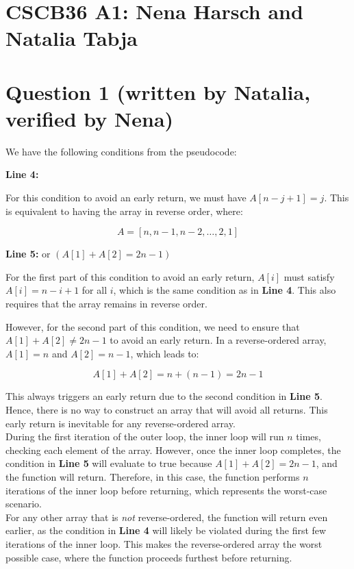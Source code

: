\documentclass[11pt, a4paper]{article}
\begin{document}
\section*{CSCB36 A1: Nena Harsch and Natalia Tabja}
\section*{Question 1 (written by Natalia, verified by Nena)}

We have the following conditions from the pseudocode:

\textbf{Line 4:}  

For this condition to avoid an early return, we must have \( A[n - j + 1] = j \). This is equivalent to having the array in reverse order, where:

\[
A = [n, n-1, n-2, \dots, 2, 1]
\]

\textbf{Line 5:}  or $(A[1] + A[2] = 2n - 1)$ 

For the first part of this condition to avoid an early return, \( A[i] \) must satisfy \( A[i] = n - i + 1 \) for all \( i \), which is the same condition as in \textbf{Line 4}. This also requires that the array remains in reverse order.

However, for the second part of this condition, we need to ensure that \( A[1] + A[2] \neq 2n - 1 \) to avoid an early return. In a reverse-ordered array, \( A[1] = n \) and \( A[2] = n - 1 \), which leads to:

\[
A[1] + A[2] = n + (n - 1) = 2n - 1
\]

This always triggers an early return due to the second condition in \textbf{Line 5}. Hence, there is no way to construct an array that will avoid all returns. This early return is inevitable for any reverse-ordered array. \\

During the first iteration of the outer loop, the inner loop will run \( n \) times, checking each element of the array. However, once the inner loop completes, the condition in \textbf{Line 5} will evaluate to true because \( A[1] + A[2] = 2n - 1 \), and the function will return. Therefore, in this case, the function performs \( n \) iterations of the inner loop before returning, which represents the worst-case scenario. \\

For any other array that is \textit{not} reverse-ordered, the function will return even earlier, as the condition in \textbf{Line 4} will likely be violated during the first few iterations of the inner loop. This makes the reverse-ordered array the worst possible case, where the function proceeds furthest before returning. \\
\end{document}
